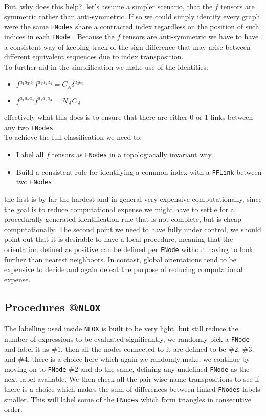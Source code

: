 \documentclass[a4paper]{article}
\def \FNode{\texttt{FNode} }
\def \FNodes{\texttt{FNodes} }
\def \FFLink{\texttt{FFLink} }
\def \NLOX{\texttt{NLOX} }
\begin{document}
But, why does this help?, let's assume a simpler scenario, that the $f$ tensors are symmetric rather than anti-symmetric. If so we could simply identify every graph were the same \FNodes share a contracted index
regardless on the position of such indices in each \FNode. Because the $f$ tensors are anti-symmetric 
we have to have a consistent way of keeping track of the sign difference that may arise between 
different equivalent sequences due to index transposition.\\

To further aid in the simplification we make use of the identities:
\begin{itemize}
 \item $f^{a_1 a_2 a_3} f^{a_1a_2a_4} = C_A \delta^{a_3a_4}$
 \item $f^{a_1 a_2 a_3} f^{a_1a_2a_3} = N_A C_A $
\end{itemize}
effectively what this does is to ensure that there are either $0$ or $1$ links between any two \texttt{FNodes}.\\

\noindent To achieve the full classification we need to:

\begin{itemize}
 \item Label all $f$ tensors as \FNodes in a topologiacally invariant way.
 \item Build a consistent rule for identifying a common index with a \FFLink between two \FNodes.
\end{itemize}
the first is by far the hardest and in general very expensive computationally, since the goal is to reduce computational expense we might have to settle for a procedurally generated identification rule that is not complete, but is cheap computationally.
The second point we need to have fully under control, we should point out that it is desirable 
to have a local procedure, meaning that the orientation defined as positive can be defined per \FNode
without having to look further than nearest neighboors. In contast, global orientations tend to be expensive 
to decide and again defeat the purpose of reducing computational expense.\\

\subsection{Procedures @\NLOX}
The labelling used inside \NLOX is built to be very light, but still reduce the number of expressions 
to be evaluated significantly, we randomly pick a \FNode and label it as $\#1$,
then all the nodes connected to it are defined to be $\#2$, $\#3$, and $\#4$, there is a choice here which 
again we randomly make, we continue by moving on to \FNode $\#2$ and do the same, defining any undefined 
\FNode as the next label available. We then check all the pair-wise name transpositions to see if 
there is a choice which makes the sum of differences between linked \FNodes labels smaller. 
This will label some of the \FNodes which form triangles in consecutive order.\\
\end{document}
